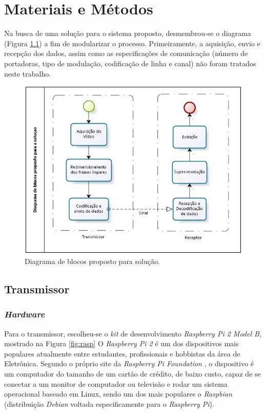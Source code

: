 \chapter[Materiais e Métodos]{Materiais e Métodos}

Na busca de uma solução para o sistema proposto, desmembrou-se o diagrama (Figura \ref{fig:blocos}) a fim de modularizar o processo. Primeiramente, a aquisição, envio e recepção dos dados, assim como as especificações de comunicação (número de portadoras, tipo de modulação, codificação de linha e canal) não foram tratados neste trabalho. 


\begin{figure}[h]
	\centering
	\includegraphics[scale=.7]{figuras/diagrama_blocos_solucao.jpg}
	\caption{Diagrama de blocos proposto para solução.}
	\label{fig:blocos}
\end{figure}

\section{Transmissor}

\subsection{\textit{Hardware}}
Para o transmissor, escolheu-se o \textit{kit} de desenvolvimento \textit{Raspberry Pi 2 Model B}, mostrado na Figura \ref{fig:rasp} O \textit{Raspberry Pi 2} é um dos dispositivos mais populares atualmente entre estudantes, profissionais e hobbistas da área de Eletrônica. Segundo o próprio site da \textit{Raspberry Pi Foundation} \cite{raspberryOrg}, o dispositivo é um computador do tamanho de um cartão de crédito, de baixo custo, capaz de se conectar a um monitor de computador ou televisão e  rodar um sistema operacional baseado em Linux, sendo um dos mais populares o \textit{Raspbian} (distribuição \textit{Debian} voltada especificamente para o \textit{Raspberry Pi}).

